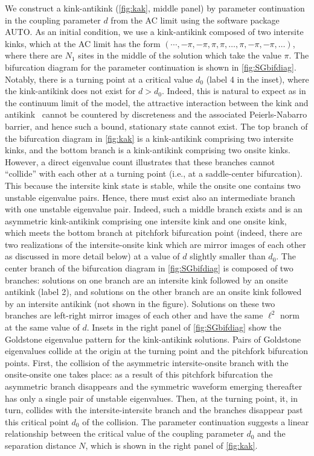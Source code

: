 \documentclass[12pt,reqno]{amsart}
\begin{document}
We construct a kink-antikink (\cref{fig:kak}, middle panel) by parameter continuation in the coupling parameter $d$ from the AC limit using the software package AUTO. As an initial condition, we use a kink-antikink composed of two intersite kinks, which at the AC limit has the form $(\cdots, -\pi, -\pi, \pi, \pi, \dots, \pi, -\pi, -\pi, \dots )$, where there are $N_1$ sites in the middle of the solution which take the value $\pi$. The bifurcation diagram for the parameter continuation is shown in \cref{fig:SGbifdiag}. Notably, there is a turning point at a critical value $d_0$ (label 4 in the inset), where the kink-antikink does not exist for $d > d_0$. 
Indeed, this is natural to expect as in the continuum
limit of the model, the attractive interaction between the
kink and antikink~\cite{MANTON1979397} 
cannot be countered by discreteness and the associated
Peierls-Nabarro barrier, and hence such a bound, stationary
state cannot exist. 
The top branch of the bifurcation diagram in \cref{fig:kak} is a kink-antikink comprising two intersite kinks, and the bottom branch is a kink-antikink comprising two onsite kinks. 
However, a direct eigenvalue count illustrates that
these branches cannot ``collide'' with each other
at a turning point (i.e., at a saddle-center bifurcation). This
because the intersite kink state is stable, while the
onsite one contains two unstable eigenvalue pairs. Hence,
there must exist also an intermediate branch with one
unstable eigenvalue pair.
Indeed, such a  middle branch exists and is an asymmetric kink-antikink comprising one intersite kink and one onsite kink, which meets the bottom branch at pitchfork bifurcation point 
(indeed, there are two realizations of the 
intersite-onsite kink which are mirror images of each other as
discussed in more detail below) at a value of $d$ slightly smaller than $d_0$. The center branch of the bifurcation diagram in \cref{fig:SGbifdiag} is composed of two branches: solutions on one branch are an intersite kink followed by an onsite antikink (label 2), and solutions on the other branch are an onsite kink followed by an intersite antikink (not shown in the figure). Solutions on these two branches are left-right mirror images of each other and have the same $\ell^2$ norm at the same value of $d$. Insets in the right panel of \cref{fig:SGbifdiag} show the Goldstone eigenvalue pattern for the kink-antikink solutions. Pairs of Goldstone eigenvalues collide at the origin at the turning point and the pitchfork bifurcation points. 
First, the collision of the asymmetric intersite-onsite
branch with the onsite-onsite one takes place: as a result
of this pitchfork bifurcation the asymmetric branch disappears
and the symmetric waveform emerging thereafter has only
a single pair of unstable eigenvalues. Then, at the turning point, it, in turn, collides with the intersite-intersite branch and the branches disappear past this critical
point $d_0$ of the collision.
The parameter continuation suggests a linear relationship between the critical value of the coupling parameter $d_0$ and the separation distance $N$, which is shown in the right panel of  \cref{fig:kak}.
\end{document}
